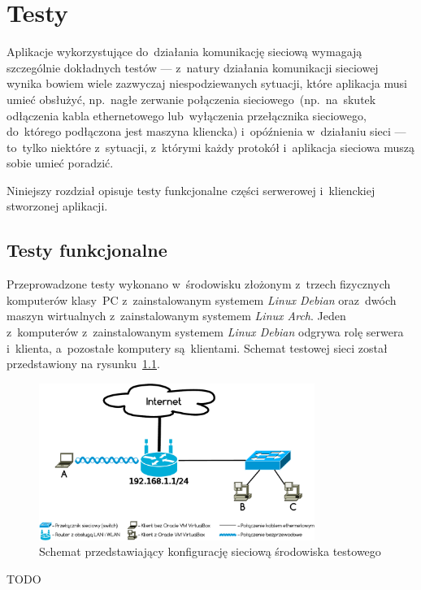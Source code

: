 \documentclass[thesis]{subfiles}
\begin{document}
\chapter{Testy}

Aplikacje wykorzystujące do~działania komunikację sieciową wymagają szczególnie dokładnych testów --- z~natury działania komunikacji sieciowej wynika bowiem wiele zazwyczaj niespodziewanych sytuacji, które aplikacja musi umieć obsłużyć, np.~nagłe zerwanie połączenia sieciowego~(np.~na~skutek odłączenia kabla ethernetowego lub~wyłączenia przełącznika sieciowego, do~którego podłączona jest maszyna kliencka) i~opóźnienia w~działaniu sieci --- to~tylko niektóre z~sytuacji, z~którymi każdy protokół i~aplikacja sieciowa muszą sobie umieć poradzić.

Niniejszy rozdział opisuje testy funkcjonalne części serwerowej i~klienckiej stworzonej aplikacji.

%
%
%

\section{Testy funkcjonalne}

Przeprowadzone testy wykonano w~środowisku złożonym z~trzech fizycznych komputerów klasy~PC z~zainstalowanym systemem \emph{Linux Debian} oraz~dwóch maszyn wirtualnych  z~zainstalowanym systemem \emph{Linux Arch}. Jeden z~komputerów z~zainstalowanym systemem \emph{Linux Debian} odgrywa rolę serwera i~klienta, a~pozostałe komputery są~klientami. Schemat testowej sieci został przedstawiony na rysunku~\ref{fig:testing-network}.

\begin{figure}
	\centering
	\includegraphics[width=0.8\textwidth]{img/testing-network}
	\caption{Schemat przedstawiający konfigurację sieciową środowiska testowego}
	\label{fig:testing-network}
\end{figure}

TODO
\end{document}
